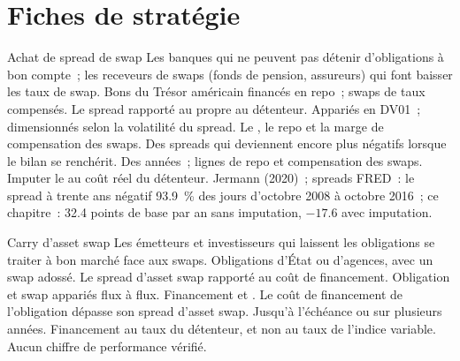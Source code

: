 \section{Fiches de stratégie}

\begin{strategyfile}{Achat de spread de swap}\label{strat:s2:swap-spread-and-asset-swap-trades:long}
 Les banques qui ne peuvent pas détenir d'obligations à bon compte~; les receveurs de swaps (fonds de pension, assureurs) qui font baisser les taux de swap.
 Bons du Trésor américain financés en repo~; swaps de taux compensés.
 Le spread rapporté au  propre au détenteur.
 Appariés en DV01~; dimensionnés selon la volatilité du spread.
 Le , le repo et la marge de compensation des swaps.
 Des spreads qui deviennent encore plus négatifs lorsque le bilan se renchérit.
 Des années~; lignes de repo et compensation des swaps.
 Imputer le  au coût réel du détenteur.
 Jermann (2020)~; spreads FRED~: le spread à trente ans négatif 93.9~\% des jours d'octobre 2008 à octobre 2016~; ce chapitre~: 32.4 points de
base par an sans imputation, $-17.6$ avec imputation.
\end{strategyfile}

\begin{strategyfile}{Carry d'asset swap}\label{strat:s2:swap-spread-and-asset-swap-trades:assetswap}
 Les émetteurs et investisseurs qui laissent les obligations se traiter à bon marché face aux swaps.
 Obligations d'État ou d'agences, avec un swap adossé.
 Le spread d'asset swap rapporté au coût de financement.
 Obligation et swap appariés flux à flux.
 Financement et .
 Le coût de financement de l'obligation dépasse son spread d'asset swap.
 Jusqu'à l'échéance ou sur plusieurs années.
 Financement au taux du détenteur, et non au taux de l'indice variable.
 Aucun chiffre de performance vérifié.
\end{strategyfile}

